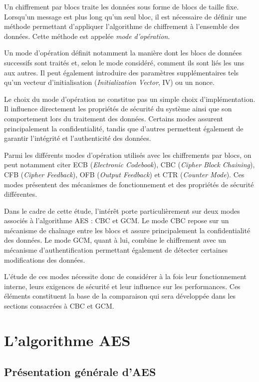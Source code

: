 \documentclass[12pt,a4paper]{article}
\begin{document}
Un chiffrement par blocs traite les données sous forme de blocs de taille fixe. Lorsqu'un message est plus long qu'un seul bloc, il est nécessaire de définir une méthode permettant d'appliquer l'algorithme de chiffrement à l'ensemble des données. Cette méthode est appelée \textit{mode d'opération}.

Un mode d'opération définit notamment la manière dont les blocs de données successifs sont traités et, selon le mode considéré, comment ils sont liés les uns aux autres. Il peut également introduire des paramètres supplémentaires tels qu'un vecteur d'initialisation (\textit{Initialization Vector}, IV) ou un nonce.

Le choix du mode d'opération ne constitue pas un simple choix d'implémentation. Il influence directement les propriétés de sécurité du système ainsi que son comportement lors du traitement des données. Certains modes assurent principalement la confidentialité, tandis que d'autres permettent également de garantir l'intégrité et l'authenticité des données.

Parmi les différents modes d'opération utilisés avec les chiffrements par blocs, on peut notamment citer ECB (\textit{Electronic Codebook}), CBC (\textit{Cipher Block Chaining}), CFB (\textit{Cipher Feedback}), OFB (\textit{Output Feedback}) et CTR (\textit{Counter Mode}). Ces modes présentent des mécanismes de fonctionnement et des propriétés de sécurité différentes.

Dans le cadre de cette étude, l'intérêt porte particulièrement sur deux modes associés à l'algorithme AES : CBC et GCM. Le mode CBC repose sur un mécanisme de chaînage entre les blocs et assure principalement la confidentialité des données. Le mode GCM, quant à lui, combine le chiffrement avec un mécanisme d'authentification permettant également de détecter certaines modifications des données.

L'étude de ces modes nécessite donc de considérer à la fois leur fonctionnement interne, leurs exigences de sécurité et leur influence sur les performances. Ces éléments constituent la base de la comparaison qui sera développée dans les sections consacrées à CBC et GCM.

\section{L'algorithme AES}

\subsection{Présentation générale d'AES}
\end{document}
